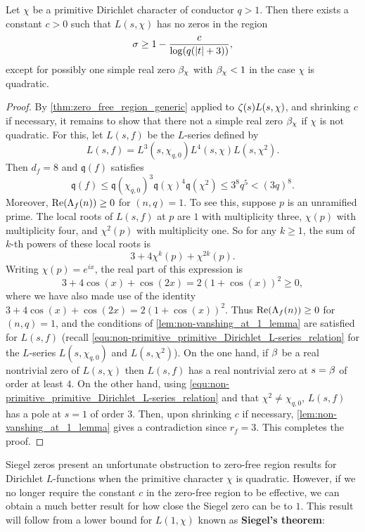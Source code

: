     \begin{theorem}\label{thm:improved_zero-free_region_Dirichlet}
      Let $\chi$ be a primitive Dirichlet character of conductor $q > 1$. Then there exists a constant $c > 0$ such that $L(s,\chi)$ has no zeros in the region
      \[
        \sigma \ge 1-\frac{c}{\log(q(|t|+3))},
      \]
      except for possibly one simple real zero $\beta_{\chi}$ with $\beta_{\chi} < 1$ in the case $\chi$ is quadratic.
    \end{theorem}
    \begin{proof}
      By \cref{thm:zero_free_region_generic} applied to $\zeta(s)L(s,\chi)$, and shrinking $c$ if necessary, it remains to show that there not a simple real zero $\beta_{\chi}$ if $\chi$ is not quadratic. For this, let $L(s,f)$ be the $L$-series defined by
      \[
        L(s,f) = L^{3}(s,\chi_{q,0})L^{4}(s,\chi)L(s,\chi^{2}).
      \]
      Then $d_{f} = 8$ and $\mathfrak{q}(f)$ satisfies
      \[
        \mathfrak{q}(f) \le \mathfrak{q}(\chi_{q,0})^{3}\mathfrak{q}(\chi)^{4}\mathfrak{q}(\chi^{2}) \le 3^{8}q^{5} < (3q)^{8}.
      \]
      Moreover, $\mathrm{Re}(\Lambda_{f}(n)) \ge 0$ for $(n,q) = 1$. To see this, suppose $p$ is an unramified prime. The local roots of $L(s,f)$ at $p$ are $1$ with multiplicity three, $\chi(p)$ with multiplicity four, and $\chi^{2}(p)$ with multiplicity one. So for any $k \ge 1$, the sum of $k$-th powers of these local roots is
      \[
        3+4\chi^{k}(p)+\chi^{2k}(p).
      \]
      Writing $\chi(p) = e^{ix}$, the real part of this expression is
      \[
        3+4\cos(x)+\cos(2x) = 2(1+\cos(x))^{2} \ge 0,
      \]
      where we have also made use of the identity $3+4\cos(x)+\cos(2x) = 2(1+\cos(x))^{2}$. Thus $\mathrm{Re}(\Lambda_{f}(n)) \ge 0$ for $(n,q) = 1$, and the conditions of \cref{lem:non-vanshing_at_1_lemma} are satisfied for $L(s,f)$ (recall \cref{equ:non-primitive_primitive_Dirichlet_L-series_relation} for the $L$-series $L(s,\chi_{q,0})$ and $L(s,\chi^{2})$). On the one hand, if $\beta$ be a real nontrivial zero of $L(s,\chi)$ then $L(s,f)$ has a real nontrivial zero at $s = \beta$ of order at least $4$. On the other hand, using \cref{equ:non-primitive_primitive_Dirichlet_L-series_relation} and that $\chi^{2} \neq \chi_{q,0}$, $L(s,f)$ has a pole at $s = 1$ of order $3$. Then, upon shrinking $c$ if necessary, \cref{lem:non-vanshing_at_1_lemma} gives a contradiction since $r_{f} = 3$. This completes the proof.
    \end{proof}

    Siegel zeros present an unfortunate obstruction to zero-free region results for Dirichlet $L$-functions when the primitive character $\chi$ is quadratic. However, if we no longer require the constant $c$ in the zero-free region to be effective, we can obtain a much better result for how close the Siegel zero can be to $1$. This result will follow from a lower bound for $L(1,\chi)$ known as \textbf{Siegel's theorem}:

